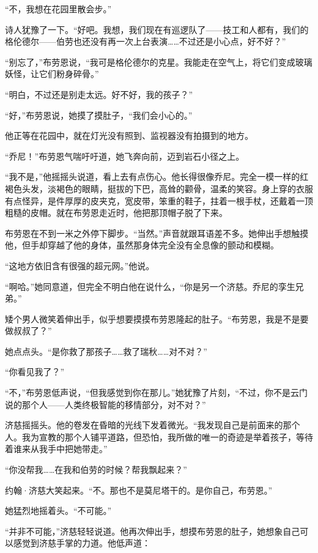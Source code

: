 \documentclass[AutoFakeBold=true]{book}
\begin{document}
``不，我想在花园里散会步。''

诗人犹豫了一下。``好吧。我想，我们现在有巡逻队了——技工和人都有，我们的格伦德尔——伯劳也还没有再一次上台表演……不过还是小心点，好不好？''

``别忘了，''布劳恩说，``我可是格伦德尔的克星。我能走在空气上，将它们变成玻璃妖怪，让它们粉身碎骨。''

``明白，不过还是别走太远。好不好，我的孩子？''

``好，''布劳恩说，她摸了摸肚子，``我们会小心的。''

\vspace*{1em}

他正等在花园中，就在灯光没有照到、监视器没有拍摄到的地方。

``乔尼！''布劳恩气喘吁吁道，她飞奔向前，迈到岩石小径之上。

``我不是，''他摇摇头说道，看上去有点伤心。他长得很像乔尼。完全一模一样的红褐色头发，淡褐色的眼睛，挺拔的下巴，高耸的颧骨，温柔的笑容。身上穿的衣服有点怪异，是件厚厚的皮夹克，宽皮带，笨重的鞋子，拄着一根手杖，还戴着一顶粗糙的皮帽。就在布劳恩走近时，他把那顶帽子脱了下来。

布劳恩在不到一米之外停下脚步。``当然。''声音就跟耳语差不多。她伸出手想触摸他，但手却穿越了他的身体，虽然那身体完全没有全息像的颤动和模糊。

``这地方依旧含有很强的超元网。''他说。

``啊哈。''她同意道，但完全不明白他在说什么，``你是另一个济慈。乔尼的孪生兄弟。''

矮个男人微笑着伸出手，似乎想要摸摸布劳恩隆起的肚子。``布劳恩，我是不是要做叔叔了？''

她点点头。``是你救了那孩子……救了瑞秋……对不对？''

``你看见我了？''

``不，''布劳恩低声说，``但我感觉到你在那儿。''她犹豫了片刻，``不过，你不是云门说的那个人——人类终极智能的移情部分，对不对？''

济慈摇摇头。他的卷发在昏暗的光线下发着微光。``我发现自己是前面来的那个人。我为宣教的那个人铺平道路，但恐怕，我所做的唯一的奇迹是举着孩子，等待着谁来从我手中把她带走。''

``你没帮我……在我和伯劳的时候？帮我飘起来？''

约翰·济慈大笑起来。``不。那也不是莫尼塔干的。是你自己，布劳恩。''

她猛烈地摇着头。``不可能。''

``并非不可能，''济慈轻轻说道。他再次伸出手，想摸布劳恩的肚子，她想象自己可以感觉到济慈手掌的力道。他低声道：
\end{document}
